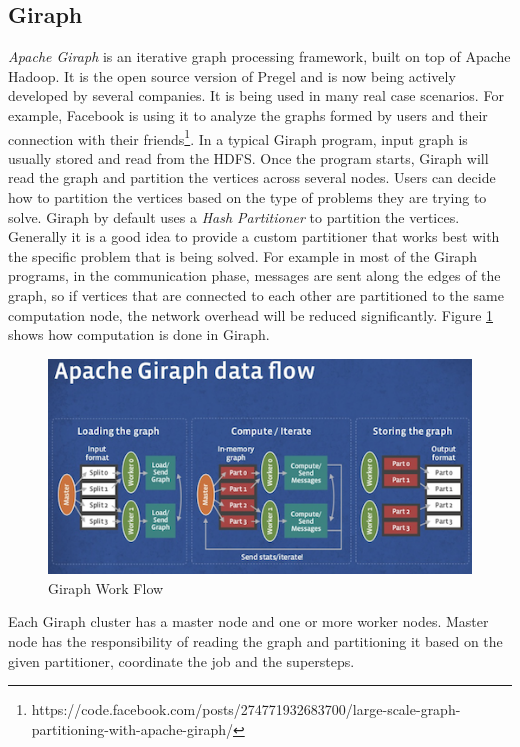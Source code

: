 \documentclass[english]{tktltiki}
\begin{document}
\subsection{Giraph}
\textit{Apache Giraph} is an iterative graph processing framework, built on top of Apache Hadoop. 
It is the open source version of Pregel and is now being actively developed by several companies. 
It is being used in many real case scenarios. 
For example, Facebook is using it to analyze the graphs formed by users and their connection with their friends\footnote{https://code.facebook.com/posts/274771932683700/large-scale-graph-partitioning-with-apache-giraph/}. 
In a typical Giraph program, input graph is usually stored and read from the HDFS.
Once the program starts, Giraph will read the graph and partition the vertices across several nodes. 
Users can decide how to partition the vertices based on the type of problems they are trying to solve. 
Giraph by default uses a \textit{Hash Partitioner} to partition the vertices. 
Generally it is a good idea to provide a custom partitioner that works best with the specific problem that is being solved. 
For example in most of the Giraph programs, in the communication phase, messages are sent along the edges of the graph, so if vertices that are connected to each other are partitioned to the same computation node, the network overhead will be reduced significantly.    
Figure \ref{fig:giraph} shows how computation is done in Giraph.
\begin{figure}[ht!]
\centering
\includegraphics[width=150mm]{figures/giraphdataflow.png}
\caption{Giraph Work Flow \protect \footnotemark}
\label{fig:giraph}
\end{figure}
Each Giraph cluster has a master node and one or more worker nodes. 
Master node has the responsibility of reading the graph and partitioning it based on the given partitioner, coordinate the job and the supersteps. 
\end{document}
